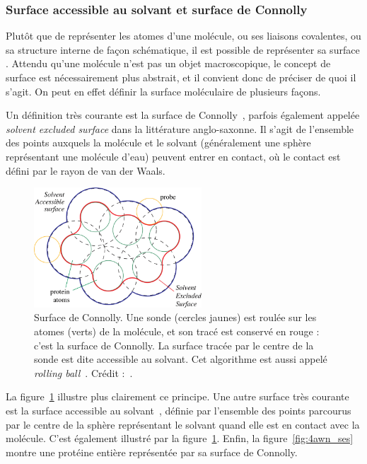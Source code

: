 \begin{appendices}
	\subsubsection{Surface accessible au solvant et surface de Connolly}
	Plutôt que de représenter les atomes d'une molécule, ou ses liaisons covalentes, ou sa structure interne de façon schématique, il est possible de représenter sa \og surface \fg{}. Attendu qu'une molécule n'est pas un objet macroscopique, le concept de surface est nécessairement plus abstrait, et il convient donc de préciser de quoi il s'agit. On peut en effet définir la surface moléculaire de plusieurs façons.
		
	Un définition très courante est la surface de Connolly~\cite{connolly1983analytical}, parfois également appelée \emph{solvent excluded surface} dans la littérature anglo-saxonne. Il s'agit de l'ensemble des points auxquels la molécule et \og le solvant \fg{} (généralement une sphère représentant une molécule d'eau) peuvent entrer en contact, où le contact est défini par le rayon de van der Waals.
	
	\begin{figure}[!htbp]
		\centering
		\includegraphics[width=0.56\textwidth]{figures/ch1/connolly}
		\caption[Surface de Connolly et accessible au solvant]{Surface de Connolly. Une sonde (cercles jaunes) est \og roulée \fg{} sur les atomes (verts) de la molécule, et son tracé est conservé en rouge : c'est la surface de Connolly. La surface tracée par le centre de la sonde est dite accessible au solvant. Cet algorithme est aussi appelé \emph{rolling ball}~\cite{shrake1973environment, connolly1983analytical, connolly1993molecular}. Crédit :~\cite{krone2009interactive}.}
		\label{fig:connolly}
	\end{figure}
	
	La figure~\ref{fig:connolly} illustre plus clairement ce principe. Une autre surface très courante est la surface accessible au solvant~\cite{lee1971interpretation}, définie par l'ensemble des points parcourus par le centre de la sphère représentant le solvant quand elle est en contact avec la molécule. C'est également illustré par la figure~\ref{fig:connolly}. Enfin, la figure~\ref{fig:4awn_ses} montre une protéine entière représentée par sa surface de Connolly.
		

\end{appendices}
